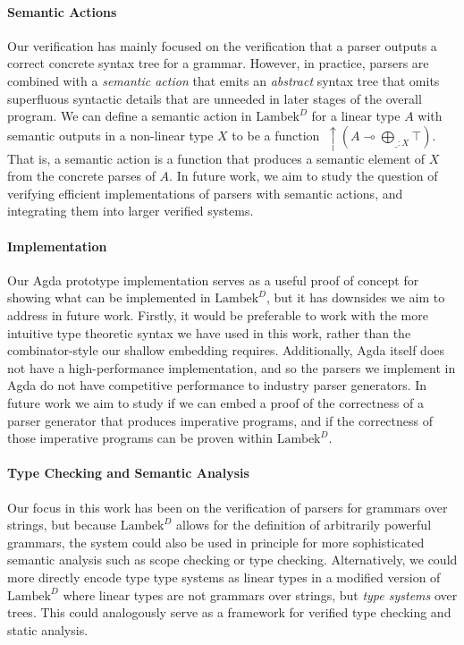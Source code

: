 \documentclass[acmsmall,nonacm]{acmart}
\newcommand{\lto}{\multimap}
\newcommand{\theoryabbv}{$\textrm{Lambek}^D$\xspace}
\newcommand{\ltonl}[1]{~\uparrow #1}
\newcommand{\LinSigTy}[3]{\textstyle\bigoplus_{#1 : #2} #3}
\begin{document}
{\paragraph{Semantic Actions}

Our verification has mainly focused on the verification that a parser outputs a
correct concrete syntax tree for a grammar. However, in practice, parsers are
combined with a \emph{semantic action} that emits an \emph{abstract} syntax tree
that omits superfluous syntactic details that are unneeded in later stages of
the overall program. We can define a semantic action in \theoryabbv for a linear
type $A$ with semantic outputs in a non-linear type $X$ to be a function $\ltonl
{(A \lto \LinSigTy{\_}{X}{\top})}$. That is, a semantic action is a function that
produces a semantic element of $X$ from the concrete parses of $A$. In future
work, we aim to study the question of verifying efficient implementations of
parsers with semantic actions, and integrating them into larger verified
systems.

\paragraph{Implementation}

Our Agda prototype implementation serves as a useful proof of concept
for showing what can be implemented in \theoryabbv, but it has
downsides we aim to address in future work. Firstly, it would be
preferable to work with the more intuitive type theoretic syntax we
have used in this work, rather than the combinator-style our shallow
embedding requires. Additionally, Agda itself does not have a
high-performance implementation, and so the parsers we implement in
Agda do not have competitive performance to industry parser
generators. In future work we aim to study if we can embed a proof of
the correctness of a parser generator that produces imperative
programs, and if the correctness of those imperative
programs can be proven within \theoryabbv.

\paragraph{Type Checking and Semantic Analysis}
Our focus in this work has been on the verification of parsers for
grammars over strings, but because \theoryabbv allows for the
definition of arbitrarily powerful grammars, the system could also be
used in principle for more sophisticated semantic analysis such as
scope checking or type checking. Alternatively, we could more directly
encode type type systems as linear types in a modified version of
\theoryabbv where linear types are not grammars over strings, but
\emph{type systems} over trees. This could analogously serve as a
framework for verified type checking and static analysis.

}
\end{document}
